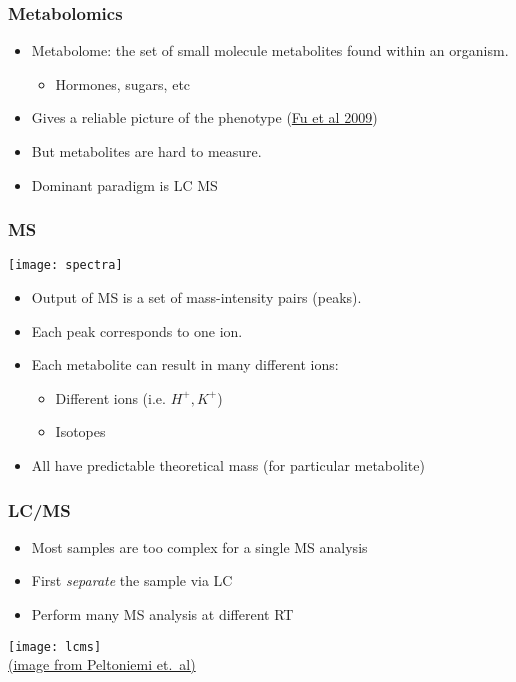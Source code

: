

\begin{frame}
	\frametitle{Metabolomics}
	\begin{itemize}
		\item Metabolome: the set of small molecule metabolites found within an organism.
		\begin{itemize}
			\item Hormones, sugars, etc 
		\end{itemize}
		\item Gives a reliable picture of the phenotype (\href{http://www.nature.com/ng/journal/v41/n2/abs/ng.308.html}{Fu et al 2009})
		\item But metabolites are hard to measure.
		\item Dominant paradigm is \ac{LC} \ac{MS}
	\end{itemize}
\end{frame}

\begin{frame}
	\frametitle{\ac{MS}}
	\centering\texttt{[image: spectra]}
	\begin{itemize}
		\item Output of \ac{MS} is a set of mass-intensity pairs (peaks).
		\item Each peak corresponds to one ion.
		\item Each metabolite can result in many different ions:
		\begin{itemize}
			\item Different ions (i.e. $H^+,K^+$)
			\item Isotopes
		\end{itemize}
		\item All have predictable theoretical mass (for particular metabolite)
	\end{itemize}
\end{frame}

\begin{frame}
	\frametitle{\ac{LC}/\ac{MS}}
	\begin{multicols}{2}
		\begin{itemize}
			\item Most samples are too complex for a single \ac{MS} analysis
			\item First \emph{separate} the sample via \ac{LC}
			\item Perform many \ac{MS} analysis at different \ac{RT}
		\end{itemize}
		\newpage
		\texttt{[image: lcms]}\\
		\href{http://www.beilstein-institut.de/glycobioinf2009/ProceedingsWeb/Peltoniemi/Peltoniemi.html}{(image from Peltoniemi et.~al)}
	\end{multicols}
\end{frame}

